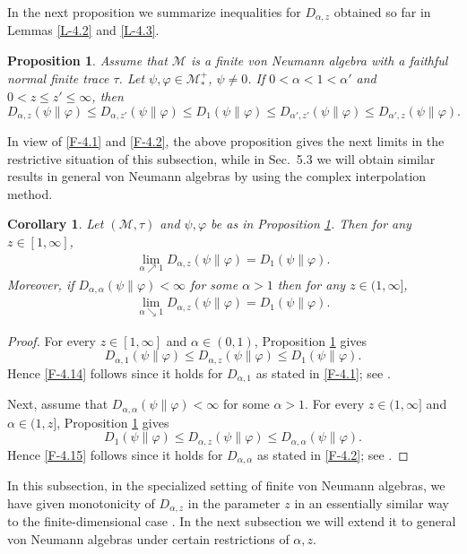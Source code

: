 \documentclass[12pt]{article}
\newtheorem{coro}[theorem]{Corollary}
\newtheorem{prop}[theorem]{Proposition}
\theoremstyle{definition}
\theoremstyle{remark}
\numberwithin{equation}{section}
\def\Me{\mathcal M}
\def\ffi{\varphi}
\begin{document}
In the next proposition we summarize inequalities for $D_{\alpha,z}$ obtained so far in Lemmas \ref{L-4.2}
and \ref{L-4.3}.

\begin{prop}\label{P-4.4}
Assume that $\Me$ is a finite von Neumann algebra with a faithful normal finite trace $\tau$. Let
$\psi,\ffi\in\Me_*^+$, $\psi\ne0$. If $0<\alpha<1<\alpha'$ and $0<z\le z'\le\infty$, then
\[
D_{\alpha,z}(\psi\|\ffi)\le D_{\alpha,z'}(\psi\|\ffi)\le D_1(\psi\|\ffi)
\le D_{\alpha',z'}(\psi\|\ffi)\le D_{\alpha',z}(\psi\|\ffi).
\]
\end{prop}

In view of \eqref{F-4.1} and \eqref{F-4.2}, the above proposition gives the next limits in the restrictive
situation of this subsection, while in Sec.~5.3 we will obtain similar results in general von Neumann algebras
by using the complex interpolation method.

\begin{coro}\label{C-4.5}
Let $(\Me,\tau)$ and $\psi,\ffi$ be as in Proposition \ref{P-4.4}. Then for any $z\in[1,\infty]$,
\begin{align}\label{F-4.14}
\lim_{\alpha\nearrow1}D_{\alpha,z}(\psi\|\ffi)=D_1(\psi\|\ffi).
\end{align}
Moreover, if $D_{\alpha,\alpha}(\psi\|\ffi)<\infty$ for some $\alpha>1$ then for any $z\in(1,\infty]$,
\begin{align}\label{F-4.15}
\lim_{\alpha\searrow1}D_{\alpha,z}(\psi\|\ffi)=D_1(\psi\|\ffi).
\end{align}
\end{coro}

\begin{proof}
For every $z\in[1,\infty]$ and $\alpha\in(0,1)$, Proposition \ref{P-4.4} gives
\[
D_{\alpha,1}(\psi\|\ffi)\le D_{\alpha,z}(\psi\|\ffi)\le D_1(\psi\|\ffi).
\]
Hence \eqref{F-4.14} follows since it holds for $D_{\alpha,1}$ {\color{red}as stated in \eqref{F-4.1};
see \cite[Proposition 5.3(3)]{hiai2018quantum}.}

Next, assume that $D_{\alpha,\alpha}(\psi\|\ffi)<\infty$ for some $\alpha>1$. For every $z\in(1,\infty]$ and
$\alpha\in(1,z]$, Proposition \ref{P-4.4} gives
\[
D_1(\psi\|\ffi)\le D_{\alpha,z}(\psi\|\ffi)\le D_{\alpha,\alpha}(\psi\|\ffi).
\]
Hence \eqref{F-4.15} follows since it holds for $D_{\alpha,\alpha}$ {\color{red}as stated in \eqref{F-4.2};
see \cite[Proposition 3.8(ii)]{jencova2018renyi}.}
\end{proof}

\medskip
In this subsection, in the specialized setting of finite von Neumann algebras, we have given monotonicity
of $D_{\alpha,z}$ in the parameter $z$ in an essentially similar way to the finite-dimensional case
\cite{mosonyi2023somecontinuity}. In the next subsection we will extend it to general von Neumann algebras
under certain restrictions of $\alpha,z$.
\end{document}

